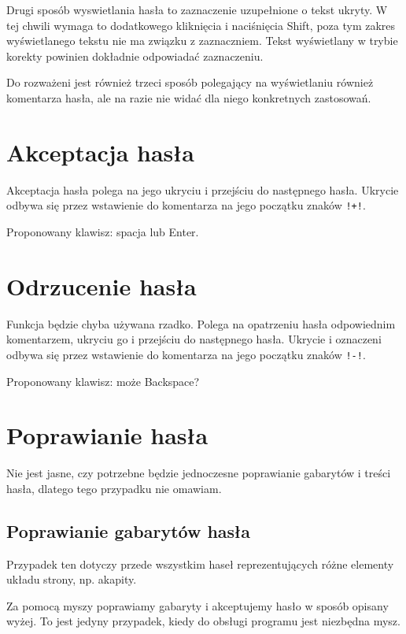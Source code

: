 \documentclass[12]{mwart}
\begin{document}
Drugi sposób wyswietlania hasła to zaznaczenie uzupełnione o tekst
ukryty. W tej chwili wymaga to dodatkowego kliknięcia i naciśnięcia
Shift, poza tym zakres wyświetlanego tekstu nie ma związku z
zaznaczniem. Tekst wyświetlany w trybie korekty powinien dokładnie
odpowiadać zaznaczeniu.

Do rozważeni jest również trzeci sposób polegający na wyświetlaniu
również komentarza hasła, ale na razie nie widać dla niego konkretnych
zastosowań.

\section{Akceptacja hasła}
\label{sec:akceptacja-hasa}

Akceptacja hasła polega na jego ukryciu i przejściu do następnego
hasła. Ukrycie odbywa się przez wstawienie do komentarza na jego
początku znaków \texttt{!+!}.

Proponowany klawisz: spacja lub Enter.

\section{Odrzucenie hasła}
\label{sec:odrzucenie-hasa}

Funkcja będzie chyba używana rzadko. Polega na opatrzeniu hasła
odpowiednim komentarzem, ukryciu go i przejściu do następnego hasła.
Ukrycie i oznaczeni odbywa się przez wstawienie do komentarza na jego
początku znaków \texttt{!-!}.

Proponowany klawisz: może Backspace?

\section{Poprawianie hasła}
\label{sec:poprawianie-hasa}

Nie jest jasne, czy potrzebne będzie jednoczesne poprawianie gabarytów
i treści hasła, dlatego tego przypadku nie omawiam.

\subsection{Poprawianie gabarytów hasła}
\label{sec:popr-gabaryt-hasa}

Przypadek ten dotyczy przede wszystkim haseł reprezentujących różne
elementy układu strony, np. akapity.

Za pomocą myszy poprawiamy gabaryty i akceptujemy hasło w sposób
opisany wyżej. To jest jedyny przypadek, kiedy do obsługi programu
jest niezbędna mysz.
\end{document}
